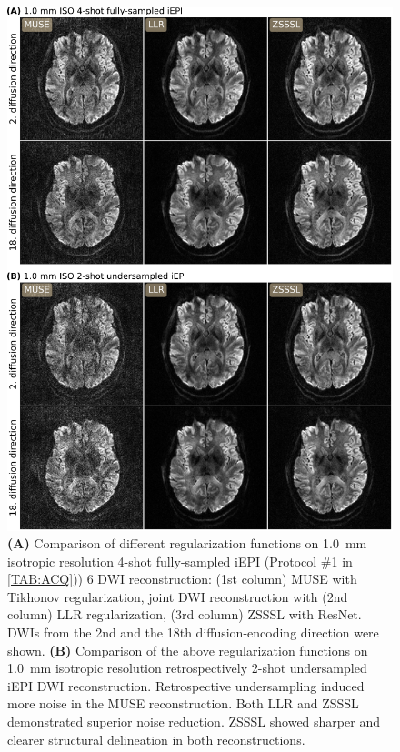 \documentclass[journal,twoside,web]{ieeecolor}
\begin{document}
	\begin{figure}
		\begin{minipage}[c]{0.75\textwidth}
			\includegraphics[width=\textwidth]{../figures/fig2.png}
		\end{minipage}\hfill
		\begin{minipage}[c]{0.23\textwidth}
			\caption{\textbf{(A)} Comparison of different regularization functions
				on \SI{1.0}{mm} isotropic resolution 4-shot fully-sampled iEPI 
				(Protocol \#1 in \cref{TAB:ACQ})) 6
				DWI reconstruction:
				(1st column) MUSE with Tikhonov regularization,
				joint DWI reconstruction with
				(2nd column) LLR regularization,
				(3rd column) ZSSSL with ResNet.
				DWIs from the 2nd and the 18th diffusion-encoding direction were shown.
				\textbf{(B)} Comparison of the above regularization functions
				on \SI{1.0}{mm} isotropic resolution
				retrospectively 2-shot undersampled iEPI DWI reconstruction. 
				Retrospective undersampling induced more noise in the MUSE reconstruction.
				Both LLR and ZSSSL demonstrated superior noise reduction. 
				ZSSSL showed sharper and clearer structural delineation 
				in both reconstructions.}
				\label{FIG:REGU}
		\end{minipage} 
	\end{figure}
\end{document}
